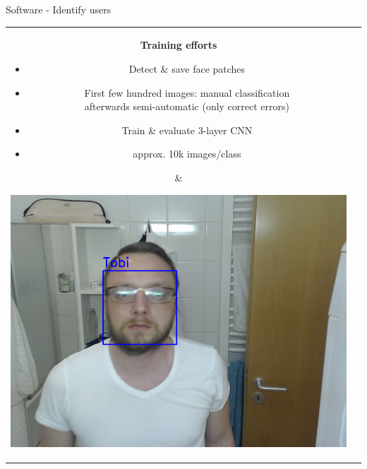 \documentclass[xcolor=svgnames,handout,aspectratio=169]{beamer}
\begin{document}
\begin{frame}
	{Software - Identify users}

	\begin{tabular}{cl}  
			\parbox{0.4\linewidth}{			
				\textbf{Training efforts}
				\begin{itemize}
					\item Detect \& save face patches
					\item First few hundred images: manual classification\\
					afterwards semi-automatic (only correct errors)
					
					\item Train \& evaluate 3-layer CNN
				\end{itemize}
				\vspace{0.5cm}
				\begin{itemize}
					\item approx. 10k images/class
				\end{itemize}
			}&
			\parbox{0.55\linewidth}{			
				\includegraphics[width=\linewidth]{images/faceimg}
			}
		\end{tabular}
\end{frame}
\end{document}
